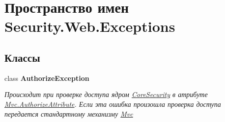 \hypertarget{namespace_security_1_1_web_1_1_exceptions}{}\section{Пространство имен Security.\+Web.\+Exceptions}
\label{namespace_security_1_1_web_1_1_exceptions}
\subsection*{Классы}
\begin{DoxyCompactItemize}
\item 
class {\bfseries Authorize\+Exception}
\begin{DoxyCompactList}\small\item\em Происходит при проверке доступа ядром \hyperlink{class_security_1_1_core_security}{Core\+Security} в атрибуте \hyperlink{class_security_1_1_web_1_1_mvc_1_1_authorize_attribute}{Mvc.\+Authorize\+Attribute}. Если эта ошибка произошла проверка доступа передается стандартному механизму \hyperlink{namespace_security_1_1_web_1_1_mvc}{Mvc} \end{DoxyCompactList}\end{DoxyCompactItemize}

